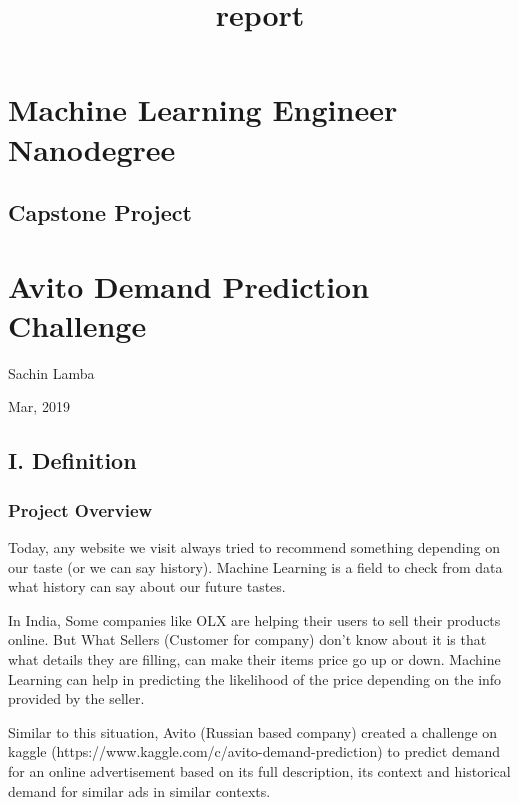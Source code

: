 \documentclass[11pt]{article}
\title{report}
\begin{document}
    
    
    \maketitle
    
    

    
    \section{Machine Learning Engineer
Nanodegree}\label{machine-learning-engineer-nanodegree}

    \subsection{Capstone Project}\label{capstone-project}

\section{Avito Demand Prediction
Challenge}\label{avito-demand-prediction-challenge}

Sachin Lamba

Mar, 2019

    \subsection{I. Definition}\label{i.-definition}

    \subsubsection{Project Overview}\label{project-overview}

    Today, any website we visit always tried to recommend something
depending on our taste (or we can say history). Machine Learning is a
field to check from data what history can say about our future tastes.

In India, Some companies like OLX are helping their users to sell their
products online. But What Sellers (Customer for company) don't know
about it is that what details they are filling, can make their items
price go up or down. Machine Learning can help in predicting the
likelihood of the price depending on the info provided by the seller.

Similar to this situation, Avito (Russian based company) created a
challenge on kaggle (https://www.kaggle.com/c/avito-demand-prediction)
to predict demand for an online advertisement based on its full
description, its context and historical demand for similar ads in
similar contexts.
\end{document}

